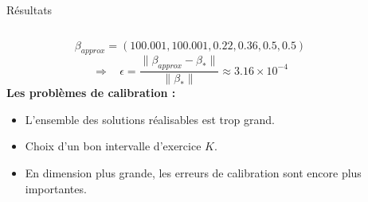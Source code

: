 \documentclass[final]{beamer}
\newlength{\sepwid}
\newlength{\onecolwid}
\newlength{\twocolwid}
\begin{document}
\begin{frame}[t]
\begin{columns}[t]
\begin{column}{\twocolwid}
\begin{block}{Résultats}
\begin{columns}[t,totalwidth=0.45\paperwidth]
\begin{column}{\onecolwid}
  $$ \beta_{approx} = (100.001,100.001,0.22,0.36,0.5,0.5) $$
  $$ \Rightarrow \ \ \ \ \epsilon = \frac{\|\beta_{approx}-\beta_* \|}{\|\beta_* \|} \approx 3.16 \times 10^{-4}$$
  \textbf{Les problèmes de calibration :}
  \begin{itemize}
    \item L'ensemble des solutions réalisables est trop grand.
    \item Choix d'un bon intervalle d'exercice $K$.
    \item En dimension plus grande, les erreurs de calibration sont encore plus importantes.
  \end{itemize}

\end{column} %

\end{columns} %

\end{block}

\end{column} %

\begin{column}{\sepwid}\end{column} %


\begin{column}{\onecolwid} %



\end{column}
\end{columns}
\end{frame}
\end{document}
